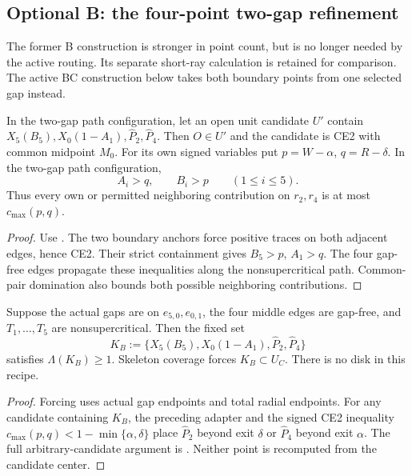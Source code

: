 \subsection{Optional B: the four-point two-gap refinement}

The former B construction is stronger in point count, but is no longer
needed by the active routing. Its separate short-ray calculation is retained
for comparison. The active BC construction below takes both boundary
points from one selected gap instead.

\begin{lemma}
\label{lem:new-two-gap-common-pair-adapter}
In the two-gap path configuration, let an open unit candidate $U'$ contain
$X_5(B_5),X_0(1-A_1),\widehat P_2,\widehat P_4$. Then $O\in U'$ and the
candidate is CE2 with common midpoint $M_0$. For its own signed variables
put $p=W-\alpha$, $q=R-\delta$. In the two-gap path configuration,
\[
 A_i>q,\qquad B_i>p\qquad(1\le i\le5).
\]
Thus every own or permitted neighboring contribution on $r_2,r_4$ is at
most $c_{\max}(p,q)$.
\end{lemma}

\begin{proof}
Use . The two boundary anchors force positive
traces on both adjacent edges, hence CE2. Their strict containment gives
$B_5>p$, $A_1>q$. The four gap-free edges propagate these inequalities
along the nonsupercritical path. Common-pair domination also bounds both
possible neighboring contributions.
\end{proof}

\begin{theorem}
\label{thm:new-ce2-short-ray}
Suppose the actual gaps are on $e_{5,0},e_{0,1}$, the four middle edges
are gap-free, and $T_1,\ldots,T_5$ are nonsupercritical. Then the fixed set
\[
 K_B:=\{X_5(B_5),X_0(1-A_1),\widehat P_2,\widehat P_4\}
\]
satisfies $\Lambda(K_B)\ge1$. Skeleton coverage forces $K_B\subset U_C$.
There is no disk in this recipe.
\end{theorem}

\begin{proof}
Forcing uses actual gap endpoints and total radial endpoints. For any
candidate containing $K_B$, the preceding adapter and the signed CE2
inequality $c_{\max}(p,q)<1-\min\{\alpha,\delta\}$ place
$\widehat P_2$ beyond exit $\delta$ or $\widehat P_4$ beyond exit $\alpha$.
The full arbitrary-candidate argument is
. Neither point is recomputed from the
candidate center.
\end{proof}

